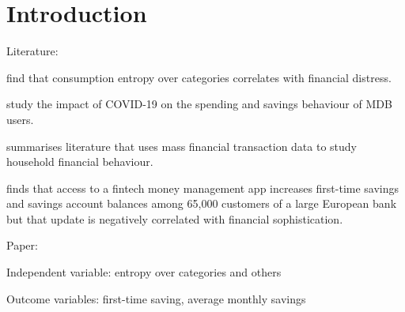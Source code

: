 
\section{Introduction}%
\label{sec:introduction}

Literature:

\citet{muggleton2020evidence} find that consumption entropy over categories
correlates with financial distress.

\citet{davenport2020spending} study the impact of COVID-19 on the spending and
savings behaviour of MDB users.

\citet{baker2021household} summarises literature that uses mass financial
transaction data to study household financial behaviour.

\citet{becker2017does} finds that access to a fintech money management app
increases first-time savings and savings account balances among 65,000 customers
of a large European bank but that update is negatively correlated with financial
sophistication.


Paper:

Independent variable: entropy over categories and others

Outcome variables: first-time saving, average monthly savings
